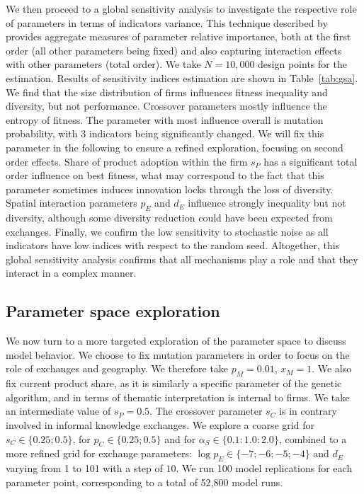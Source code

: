 \documentclass[letterpaper]{article}
\begin{document}
We then proceed to a global sensitivity analysis to investigate the respective role of parameters in terms of indicators variance. This technique described by \cite{saltelli2008global} provides aggregate measures of parameter relative importance, both at the first order (all other parameters being fixed) and also capturing interaction effects with other parameters (total order). We take $N = 10,000$ design points for the estimation. Results of sensitivity indices estimation are shown in Table~\ref{tab:gsa}. We find that the size distribution of firms influences fitness inequality and diversity, but not performance. Crossover parameters mostly influence the entropy of fitness. The parameter with most influence overall is mutation probability, with 3 indicators being significantly changed. We will fix this parameter in the following to ensure a refined exploration, focusing on second order effects. Share of product adoption within the firm $s_P$ has a significant total order influence on best fitness, what may correspond to the fact that this parameter sometimes induces innovation locks through the loss of diversity. Spatial interaction parameters $p_E$ and $d_E$ influence strongly inequality but not diversity, although some diversity reduction could have been expected from exchanges. Finally, we confirm the low sensitivity to stochastic noise as all indicators have low indices with respect to the random seed. Altogether, this global sensitivity analysis confirms that all mechanisms play a role and that they interact in a complex manner.




\subsection{Parameter space exploration}





We now turn to a more targeted exploration of the parameter space to discuss model behavior. We choose to fix mutation parameters in order to focus on the role of exchanges and geography. We therefore take $p_M = 0.01$, $x_M = 1$. We also fix current product share, as it is similarly a specific parameter of the genetic algorithm, and in terms of thematic interpretation is internal to firms. We take an intermediate value of $s_P = 0.5$. The crossover parameter $s_C$ is in contrary involved in informal knowledge exchanges. We explore a coarse grid for $s_C \in \{0.25 ; 0.5\}$, for $p_C \in \{0.25 ; 0.5\}$ and for $\alpha_S \in \{0.1 : 1.0 : 2.0\}$, combined to a more refined grid for exchange parameters: $\log p_E \in \{-7 ; -6 ; -5 ; -4\}$ and $d_E$ varying from 1 to 101 with a step of $10$. We run 100 model replications for each parameter point, corresponding to a total of 52,800 model runs.
\end{document}
